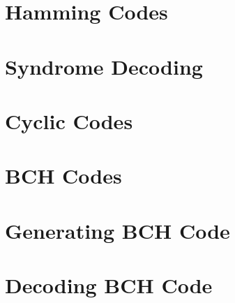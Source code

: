 \documentclass[../main.tex]{subfiles}
\begin{document}
    \section{Hamming Codes}


    \section{Syndrome Decoding}


    \section{Cyclic Codes}


    \section{BCH Codes}


    \section{Generating BCH Code}


    \section{Decoding BCH Code}
\end{document}
